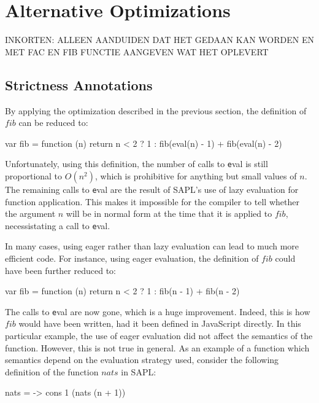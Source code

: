 \section{Alternative Optimizations}\label{sapljs:sec:optimizations}
INKORTEN: ALLEEN AANDUIDEN DAT HET GEDAAN KAN WORDEN EN MET FAC EN FIB FUNCTIE AANGEVEN WAT HET OPLEVERT

\subsection{Strictness Annotations}
By applying the optimization described in the previous section, the definition
of $fib$ can be reduced to:

\begin{CleanCode}
var fib = function (n) {
    return n < 2 ? 1 : fib(eval(n) - 1) + fib(eval(n) - 2)
}
\end{CleanCode}

Unfortunately, using this definition, the number of calls to {\texttt eval} is
still proportional to $O(n^2)$, which is prohibitive for anything but small
values of $n$. The remaining calls to {\texttt eval} are the result of SAPL's
use of lazy evaluation for function application. This makes it impossible for
the compiler to tell whether the argument $n$ will be in normal form at the time
that it is applied to $fib$, necessistating a call to {\texttt eval}.

In many cases, using eager rather than lazy evaluation can lead to much more
efficient code. For instance, using eager evaluation, the definition of $fib$
could have been further reduced to:

\begin{CleanCode}
var fib = function (n) {
    return n < 2 ? 1 : fib(n - 1) + fib(n - 2)
}
\end{CleanCode}

The calls to {\texttt eval} are now gone, which is a huge improvement. Indeed,
this is how $fib$ would have been written, had it been defined in JavaScript
directly. In this particular example, the use of eager evaluation did not affect
the semantics of the function. However, this is not true in general. As an
example of a function which semantics depend on the evaluation strategy used,
consider the following definition of the function $nats$ in SAPL:

\begin{CleanCode}
nats = \n -> cons 1 (nats (n + 1))
\end{CleanCode}

